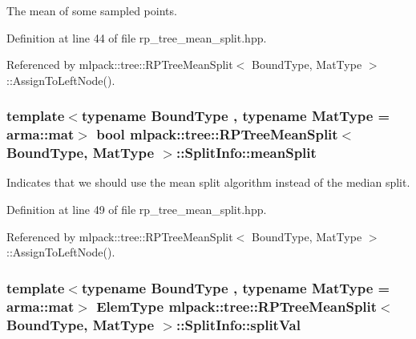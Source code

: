 The mean of some sampled points. 



Definition at line 44 of file rp\+\_\+tree\+\_\+mean\+\_\+split.\+hpp.



Referenced by mlpack\+::tree\+::\+R\+P\+Tree\+Mean\+Split$<$ Bound\+Type, Mat\+Type $>$\+::\+Assign\+To\+Left\+Node().

\subsubsection[{mean\+Split}]{\setlength{\rightskip}{0pt plus 5cm}template$<$typename Bound\+Type , typename Mat\+Type  = arma\+::mat$>$ bool {\bf mlpack\+::tree\+::\+R\+P\+Tree\+Mean\+Split}$<$ Bound\+Type, Mat\+Type $>$\+::Split\+Info\+::mean\+Split}\label{structmlpack_1_1tree_1_1RPTreeMeanSplit_1_1SplitInfo_ae8a24f7008e00f0c156da3054778b0b5}


Indicates that we should use the mean split algorithm instead of the median split. 



Definition at line 49 of file rp\+\_\+tree\+\_\+mean\+\_\+split.\+hpp.



Referenced by mlpack\+::tree\+::\+R\+P\+Tree\+Mean\+Split$<$ Bound\+Type, Mat\+Type $>$\+::\+Assign\+To\+Left\+Node().

\subsubsection[{split\+Val}]{\setlength{\rightskip}{0pt plus 5cm}template$<$typename Bound\+Type , typename Mat\+Type  = arma\+::mat$>$ {\bf Elem\+Type} {\bf mlpack\+::tree\+::\+R\+P\+Tree\+Mean\+Split}$<$ Bound\+Type, Mat\+Type $>$\+::Split\+Info\+::split\+Val}\label{structmlpack_1_1tree_1_1RPTreeMeanSplit_1_1SplitInfo_a8448f97213c052c7fe46ddb7d24ae4f7}


